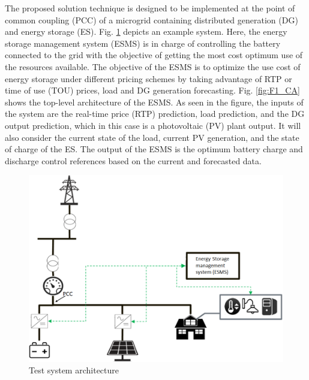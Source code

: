 The proposed solution technique is designed to be implemented at the point of common coupling (PCC) of a microgrid containing distributed generation (DG) and energy storage (ES). Fig. \ref{fig:system_arch} depicts an example system. Here, the energy storage management system (ESMS) is in charge of controlling the battery connected to the grid with the objective of getting the most cost optimum use of the resources available. The objective of the ESMS is to optimize the use cost of energy storage under different pricing schemes by taking advantage of RTP or time of use (TOU) prices, load and DG generation forecasting.  Fig. \ref{fig:F1_CA} shows the top-level architecture of the ESMS. As seen in the figure, the inputs of the system are the real-time price (RTP) prediction, load prediction, and the DG output prediction, which in this case is a photovoltaic (PV) plant output. It will also consider the current state of the load, current PV generation, and the state of charge of the ES. The output of the ESMS is the optimum battery charge and discharge control references based on the current and forecasted data.

\begin{figure}[!htbp]
\centering
\includegraphics[width=\linewidth]{figs/System_architecture.png}
\caption{Test system architecture}
\label{fig:system_arch}
\vspace{-3mm}
\end{figure}


